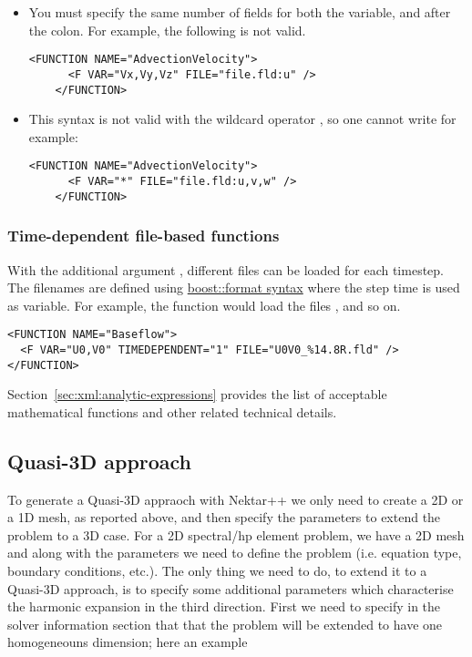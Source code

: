 \begin{itemize}
  \item You must specify the same number of fields for both the variable, and
  after the colon. For example, the following is not valid.
  \begin{lstlisting}[style=XMLStyle,gobble=4]
    <FUNCTION NAME="AdvectionVelocity">
      <F VAR="Vx,Vy,Vz" FILE="file.fld:u" />
    </FUNCTION>\end{lstlisting}
  \item This syntax is not valid with the wildcard operator \inltt{*}, so one
  cannot write for example:
  \begin{lstlisting}[style=XMLStyle,gobble=4]
    <FUNCTION NAME="AdvectionVelocity">
      <F VAR="*" FILE="file.fld:u,v,w" />
    </FUNCTION>
  \end{lstlisting}
\end{itemize}

\subsubsection{Time-dependent file-based functions}

With the additional argument , different files can be
loaded for each timestep. The filenames are defined using
\href{http://www.boost.org/doc/libs/1_56_0/libs/format/doc/format.html#syntax}{boost::format
  syntax} where the step time is used as variable. For example, the function
 would load the files ,
 and so on.

\begin{lstlisting}[style=XMLStyle]
<FUNCTION NAME="Baseflow">
  <F VAR="U0,V0" TIMEDEPENDENT="1" FILE="U0V0_%14.8R.fld" />
</FUNCTION>
\end{lstlisting}

Section~\ref{sec:xml:analytic-expressions} provides the list of acceptable
mathematical functions and other related technical details.

\subsection{Quasi-3D approach}

To generate a Quasi-3D appraoch with Nektar++ we only need to create a 2D or a
1D mesh, as reported above, and then specify the parameters to extend the
problem to a 3D case. For a 2D spectral/hp element problem, we have a 2D mesh
and along with the parameters we need to define the problem (i.e. equation type,
boundary conditions, etc.). The only thing we need to do, to extend it to a
Quasi-3D approach, is to specify some additional parameters which characterise
the harmonic expansion in the third direction. First we need to specify in the
solver information section that that the problem will be extended to have one
homogeneouns dimension; here an example


